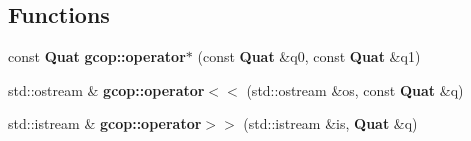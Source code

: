 \subsection*{\-Functions}
\begin{DoxyCompactItemize}
\item 
const {\bf \-Quat} {\bf gcop\-::operator$\ast$} (const {\bf \-Quat} \&q0, const {\bf \-Quat} \&q1)
\item 
std\-::ostream \& {\bf gcop\-::operator$<$$<$} (std\-::ostream \&os, const {\bf \-Quat} \&q)
\item 
std\-::istream \& {\bf gcop\-::operator$>$$>$} (std\-::istream \&is, {\bf \-Quat} \&q)
\end{DoxyCompactItemize}
